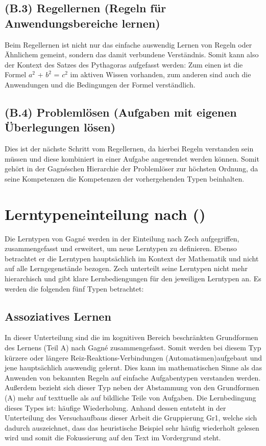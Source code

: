 \subsection[]{(B.3) Regellernen (Regeln für Anwendungsbereiche lernen)}

Beim Regellernen ist nicht nur das einfache auswendig Lernen von Regeln oder Ähnlichem gemeint, sondern das damit verbundene Verständnis. Somit kann also der Kontext des Satzes des Pythagoras aufgefasst werden: Zum einen ist die Formel $a^2$ + $b^2$ = $c^2$ im aktiven Wissen vorhanden, zum anderen sind auch die Anwendungen und die Bedingungen der Formel verständlich.

\subsection[]{(B.4) Problemlösen (Aufgaben mit eigenen Überlegungen lösen)}

Dies ist der nächste Schritt vom Regellernen, da hierbei Regeln verstanden sein müssen und diese kombiniert in einer Aufgabe angewendet werden können. Somit gehört in der Gagnéschen Hierarchie der Problemlöser zur höchsten Ordnung, da seine Kompetenzen die Kompetenzen der vorhergehenden Typen beinhalten.

\section{Lerntypeneinteilung nach \citeauthor{zech1983grundkurs} ()}

Die Lerntypen von Gagné werden in der Einteilung nach Zech aufgegriffen, zusammengefasst und erweitert, um neue Lerntypen zu definieren. Ebenso betrachtet er die Lerntypen hauptsächlich im Kontext der Mathematik und nicht auf alle Lerngegenstände bezogen. Zech unterteilt seine Lerntypen nicht mehr hierarchisch und gibt klare Lernbediengungen für den jeweiligen Lerntypen an. Es werden die folgenden fünf Typen betrachtet:

\subsection[]{Assoziatives Lernen}

In dieser Unterteilung sind die im kognitiven Bereich beschränkten Grundformen des Lernens (Teil A) nach Gagné zusammengefasst. Somit werden bei diesem Typ \grqq kürzere oder längere Reiz-Reaktions-Verbindungen (Automatismen)\grqq  aufgebaut und jene hauptsächlich auswendig gelernt. Dies kann im mathematischen Sinne als das Anwenden von bekannten Regeln auf einfache Aufgabentypen verstanden werden. Außerdem bezieht sich dieser Typ neben der Abstammung von den Grundformen (A) mehr auf texttuelle als auf bildliche Teile von Aufgaben.
Die Lernbedingung dieses Types ist: häufige Wiederholung. 
Anhand dessen entsteht in der Unterteilung des Versuchaufbaus dieser Arbeit die Gruppierung \gls{Gr1}, welche sich dadurch auszeichnet, dass das heuristische Beispiel sehr häufig wiederholt gelesen wird und somit die Fokussierung auf den Text im Vordergrund steht. 


